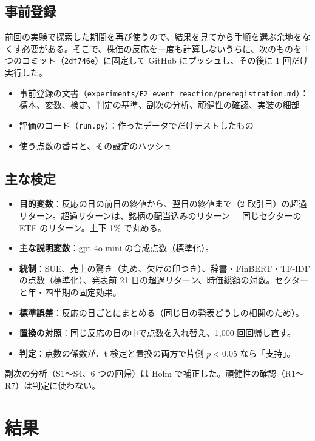 \documentclass[xelatex,ja=standard,jafont=haranoaji,a4paper,10pt,openany]{bxjsreport}
\newcommand{\code}[1]{\texttt{#1}}
\begin{document}
\section{事前登録}

前回の実験で探索した期間を再び使うので、結果を見てから手順を選ぶ余地をなくす必要がある。そこで、株価の反応を一度も計算しないうちに、次のものを 1 つのコミット（\code{2df746e}）に固定して GitHub にプッシュし、その後に 1 回だけ実行した。

\begin{itemize}
\item 事前登録の文書（\code{experiments/E2\_event\_reaction/preregistration.md}）：標本、変数、検定、判定の基準、副次の分析、頑健性の確認、実装の細部
\item 評価のコード（\code{run.py}）：作ったデータでだけテストしたもの
\item 使う点数の番号と、その設定のハッシュ
\end{itemize}

\section{主な検定}

\begin{itemize}
\item \textbf{目的変数}：反応の日の前日の終値から、翌日の終値まで（2 取引日）の超過リターン。超過リターンは、銘柄の配当込みのリターン $-$ 同じセクターの ETF のリターン。上下 1\% で丸める。
\item \textbf{主な説明変数}：gpt-4o-mini の合成点数（標準化）。
\item \textbf{統制}：SUE、売上の驚き（丸め、欠けの印つき）、辞書・FinBERT・TF-IDF の点数（標準化）、発表前 21 日の超過リターン、時価総額の対数。セクターと年・四半期の固定効果。
\item \textbf{標準誤差}：反応の日ごとにまとめる（同じ日の発表どうしの相関のため）。
\item \textbf{置換の対照}：同じ反応の日の中で点数を入れ替え、1,000 回回帰し直す。
\item \textbf{判定}：点数の係数が、t 検定と置換の両方で片側 $p<0.05$ なら「支持」。
\end{itemize}

副次の分析（S1〜S4、6 つの回帰）は Holm で補正した。頑健性の確認（R1〜R7）は判定に使わない。

\chapter{結果}\label{ch:result}
\end{document}
